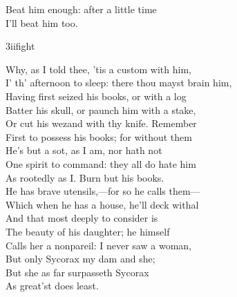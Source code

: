 	


\begin{verse_speech}[Caliban]
Beat him enough: after a little time\\
I'll beat him too.
\end{verse_speech}

\begin{pictures}
	
\begin{bwbigpic}
	[\picwidth]
	{3iifight}
	{}
\end{bwbigpic}

\end{pictures}


\begin{verse_speech}[Caliban] 
Why, as I told thee, 'tis a custom with him,\\
I' th' afternoon to sleep: there thou mayst brain him,\\
Having first seized his books, or with a log\\
Batter his skull, or paunch him with a stake,\\
Or cut his wezand with thy knife. Remember\\
First to possess his books; for without them\\
He's but a sot, as I am, nor hath not\\
One spirit to command: they all do hate him\\
As rootedly as I. Burn but his books.\\
He has brave utensils,—for so he calls them—\\
Which when he has a house, he'll deck withal\\
And that most deeply to consider is\\
The beauty of his daughter; he himself\\
Calls her a nonpareil: I never saw a woman,\\
But only Sycorax my dam and she;\\
But she as far surpasseth Sycorax\\
As great'st does least.
\end{verse_speech}

